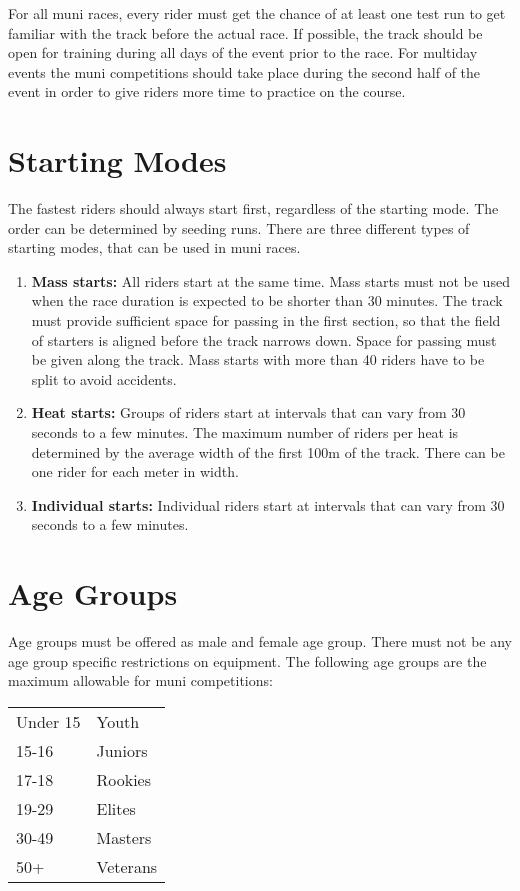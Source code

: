 For all muni races, every rider must get the chance of at least one test run to get familiar with the track before the actual race.
If possible, the track should be open for training during all days of the event prior to the race.
For multiday events the muni competitions should take place during the second half of the event in order to give riders more time to practice on the course.

\section{Starting Modes}
The fastest riders should always start first, regardless of the starting mode.
The order can be determined by seeding runs.
There are three different types of starting modes, that can be used in muni races.
\begin{enumerate}
\item \textbf{Mass starts:} All riders start at the same time.
Mass starts must not be used when the race duration is expected to be shorter than 30 minutes.
The track must provide sufficient space for passing in the first section, so that the field of starters is aligned before the track narrows down.
Space for passing must be given along the track.
Mass starts with more than 40 riders have to be split to avoid accidents.
\item \textbf{Heat starts:} Groups of riders start at intervals that can vary from 30 seconds to a few minutes.
The maximum number of riders per heat is determined by the average width of the first 100m of the track.
There can be one rider for each meter in width.
\item \textbf{Individual starts:} Individual riders start at intervals that can vary from 30 seconds to a few minutes.
\end{enumerate}

\section{Age Groups}
Age groups must be offered as male and female age group.
There must not be any age group specific restrictions on equipment.
The following age groups are the maximum allowable for muni competitions:

\begin{tabular}{ l l}
Under 15 & Youth \\
15-16 & Juniors \\
17-18 & Rookies \\
19-29 & Elites \\
30-49 & Masters \\
50+ & Veterans \\
\end{tabular}

